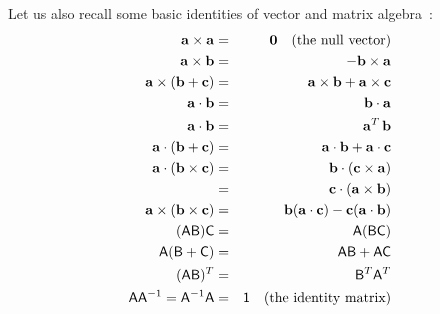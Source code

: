 Let us also recall some basic identities of vector and matrix algebra~\cite{RHB:02}:
\begin{eqnarray*}
\ve{a}\times\ve{a} & = & \ve{0}\quad\mathrm{(the~null~vector)} \\
\ve{a}\times\ve{b} & = & -\ve{b}\times\ve{a} \\
\ve{a}\times(\ve{b} + \ve{c}) & = & \ve{a}\times\ve{b} + \ve{a}\times\ve{c} \\
\ve{a}\cdot\ve{b} & = & \ve{b}\cdot\ve{a} \\
\ve{a}\cdot\ve{b} & = & \ve{a}^T\,\ve{b} \\
\ve{a}\cdot(\ve{b} + \ve{c}) & = & \ve{a}\cdot\ve{b} + \ve{a}\cdot\ve{c} \\
\ve{a}\cdot(\ve{b}\times\ve{c}) & = & \ve{b}\cdot(\ve{c}\times\ve{a}) \\
    & = & \ve{c}\cdot(\ve{a}\times\ve{b}) \\
\ve{a}\times(\ve{b}\times\ve{c}) & = &
    \ve{b}(\ve{a}\cdot\ve{c}) - \ve{c}(\ve{a}\cdot\ve{b}) \\
(\m{A}\m{B})\m{C} & = & \m{A}(\m{B}\m{C}) \\
\m{A}(\m{B} + \m{C}) & = & \m{A}\m{B} + \m{A}\m{C} \\
(\m{A}\m{B})^T & = & \m{B}^T\m{A}^T \\
\m{A}\m{A}^{-1} = \m{A}^{-1}\m{A} & = & \m{1}\quad\mathrm{(the~identity~matrix)}
\end{eqnarray*}

